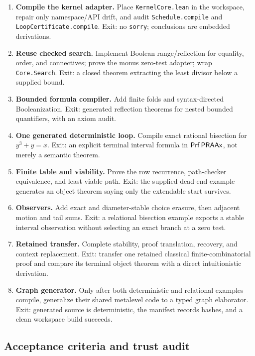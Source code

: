 \begin{enumerate}[label=\textbf{Phase \arabic*.},leftmargin=5em]
\item \textbf{Compile the kernel adapter.}  Place \texttt{KernelCore.lean} in the workspace, repair only namespace/API drift, and audit \texttt{Schedule.compile} and \texttt{LoopCertificate.compile}.  Exit: no \texttt{sorry}; conclusions are embedded derivations.
\item \textbf{Reuse checked search.}  Implement Boolean range/reflection for equality, order, and connectives; prove the monus zero-test adapter; wrap \texttt{Core.Search}.  Exit: a closed theorem extracting the least divisor below a supplied bound.
\item \textbf{Bounded formula compiler.}  Add finite folds and syntax-directed Booleanization.  Exit: generated reflection theorems for nested bounded quantifiers, with an axiom audit.
\item \textbf{One generated deterministic loop.}  Compile exact rational bisection for \(y^3+y=x\).  Exit: an explicit terminal interval formula in \(\mathsf{Prf}\,\mathsf{PRAAx}\), not merely a semantic theorem.
\item \textbf{Finite table and viability.}  Prove the row recurrence, path-checker equivalence, and least viable path.  Exit: the supplied dead-end example generates an object theorem saying only the extendable start survives.
\item \textbf{Observers.}  Add exact and diameter-stable choice erasure, then adjacent motion and tail sums.  Exit: a relational bisection example exports a stable interval observation without selecting an exact branch at a zero test.
\item \textbf{Retained transfer.}  Complete stability, proof translation, recovery, and context replacement.  Exit: transfer one retained classical finite-combinatorial proof and compare its terminal object theorem with a direct intuitionistic derivation.
\item \textbf{Graph generator.}  Only after both deterministic and relational examples compile, generalize their shared metalevel code to a typed graph elaborator.  Exit: generated source is deterministic, the manifest records hashes, and a clean workspace build succeeds.
\end{enumerate}

\subsection{Acceptance criteria and trust audit}

